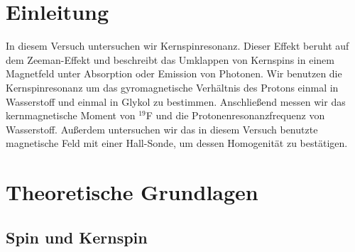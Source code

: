 \documentclass[12pt]{article}
\title{\vspace{0cm}{\Huge Fortgeschrittenen-Praktikum I:\\ \vspace{1cm} Nuclear Magnetic Resonance}}
\author{Saskia Bondza\\Simon Stephan}
\date{performed on 15.09.2016 and 16.09.2016}
\begin{document}
\maketitle
\newpage

\thispagestyle{empty}
\tableofcontents
\newpage

\section{Einleitung}



In diesem Versuch untersuchen wir Kernspinresonanz. Dieser Effekt beruht auf dem Zeeman-Effekt und beschreibt das Umklappen von Kernspins in einem Magnetfeld unter Absorption oder Emission von Photonen. Wir benutzen die Kernspinresonanz um das gyromagnetische Verhältnis des Protons einmal in Wasserstoff und einmal in Glykol zu bestimmen. Anschließend messen wir das kernmagnetische Moment von $^{19}$F und die Protonenresonanzfrequenz von Wasserstoff. Außerdem untersuchen wir das in diesem Versuch benutzte magnetische Feld mit einer Hall-Sonde, um dessen Homogenität zu bestätigen.


\newpage
\section{Theoretische Grundlagen}
\subsection{Spin und Kernspin}
\end{document}
